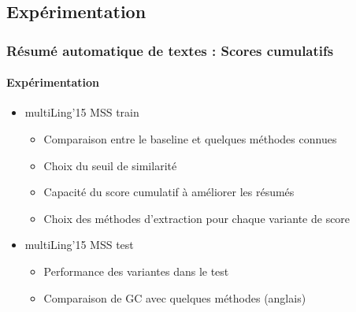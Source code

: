 \documentclass[xcolor=table]{beamer}
\begin{document}
\subsection{Expérimentation}

\begin{frame}
	\frametitle{Résumé automatique de textes : Scores cumulatifs}
	\framesubtitle{Expérimentation}
	
	\begin{itemize}
		\item multiLing'15 MSS train 
		\begin{itemize}
			\item Comparaison entre le baseline et quelques méthodes connues
			\item Choix du seuil de similarité
			\item Capacité du score cumulatif à améliorer les résumés
			\item Choix des méthodes d'extraction pour chaque variante de score
		\end{itemize}
		\item multiLing'15 MSS test 
		\begin{itemize}
			\item Performance des variantes dans le test
			\item Comparaison de GC avec quelques méthodes (anglais)
		\end{itemize}
	\end{itemize}

\end{frame}
\end{document}
